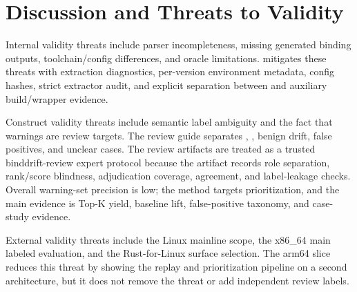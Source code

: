 \section{Discussion and Threats to Validity}

Internal validity threats include parser incompleteness, missing generated
binding outputs, toolchain/config differences, and oracle limitations. \tool{}
mitigates these threats with extraction diagnostics, per-version environment
metadata, config hashes, strict extractor audit, and explicit separation
between \primary{} and auxiliary build/wrapper evidence.

Construct validity threats include semantic label ambiguity and the fact that
warnings are review targets. The review guide separates \truesemantic{},
\truewrapper{}, benign drift, false positives, and unclear cases. The review
artifacts are treated as a trusted binddrift-review expert protocol because
the artifact records role separation, rank/score blindness, adjudication
coverage, agreement, and label-leakage checks. Overall warning-set precision is
low; the method targets prioritization, and the main evidence is Top-K yield,
baseline lift, false-positive taxonomy, and case-study evidence.

External validity threats include the Linux mainline scope, the x86\_64 main
labeled evaluation, and the Rust-for-Linux surface selection. The arm64 slice
reduces this threat by showing the replay and prioritization pipeline on a
second architecture, but it does not remove the threat or add independent
review labels.
